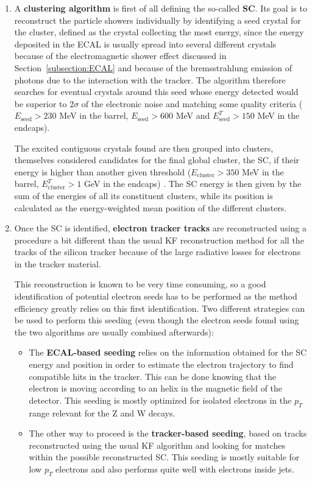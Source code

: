 \documentclass[a4paper, 10pt, openright]{report}
\begin{document}
\begin{enumerate}
\item A \textbf{clustering algorithm} is first of all defining the so-called \textbf{\acf{SC}}. Its goal is to reconstruct the particle showers individually by identifying a seed crystal for the cluster, defined as the crystal collecting the most energy, since the energy deposited in the \ac{ECAL} is usually spread into several different crystals because of the electromagnetic shower effect discussed in Section~\ref{subsection:ECAL} and because of the bremsstrahlung emission of photons due to the interaction with the tracker. The algorithm therefore searches for eventual crystals around this seed whose energy detected would be superior to 2$\sigma$ of the electronic noise and matching some quality criteria ($E_{\text{seed}} > 230$ MeV in the barrel, $E_{\text{seed}} > 600$ MeV and $E_{\text{seed}}^T > 150$ MeV in the endcaps). 

The excited contiguous crystals found are then grouped into clusters, themselves considered candidates for the final global cluster, the \ac{SC}, if their energy is higher than another given threshold ($E_{\text{cluster}} > 350$ MeV in the barrel, $E_{\text{cluster}}^T > 1$ GeV in the endcaps) \cite{EleReco}. The \ac{SC} energy is then given by the sum of the energies of all its constituent clusters, while its position is calculated as the energy-weighted mean position of the different clusters.

\item Once the \ac{SC} is identified, \textbf{electron tracker tracks} are reconstructed using a procedure a bit different than the usual \ac{KF} reconstruction method for all the tracks of the silicon tracker \cite{KF} because of the large radiative
losses for electrons in the tracker material. 

This reconstruction is known to be very time consuming, so a good identification of potential electron seeds has to be performed as the method efficiency greatly relies on this first identification. Two different strategies can be used to perform this seeding (even though the electron seeds found using the two algorithms are usually combined afterwards): 

\begin{itemize}
\item The \textbf{\ac{ECAL}-based seeding} relies on the information obtained for the \ac{SC} energy and position in order to estimate the electron trajectory to find compatible hits in the tracker. This can be done knowing that the electron is moving according to an helix in the magnetic field of the detector. This seeding is mostly optimized for isolated electrons
in the $p_T$ range relevant for the Z and W decays.
\item The other way to proceed is the \textbf{tracker-based seeding}, based on tracks reconstructed using the usual \ac{KF} algorithm and looking for matches within the possible reconstructed \ac{SC}. This seeding is mostly suitable for low $p_T$ electrons and also performs quite well with electrons inside jets.
\end{itemize}


\end{enumerate}
\end{document}
